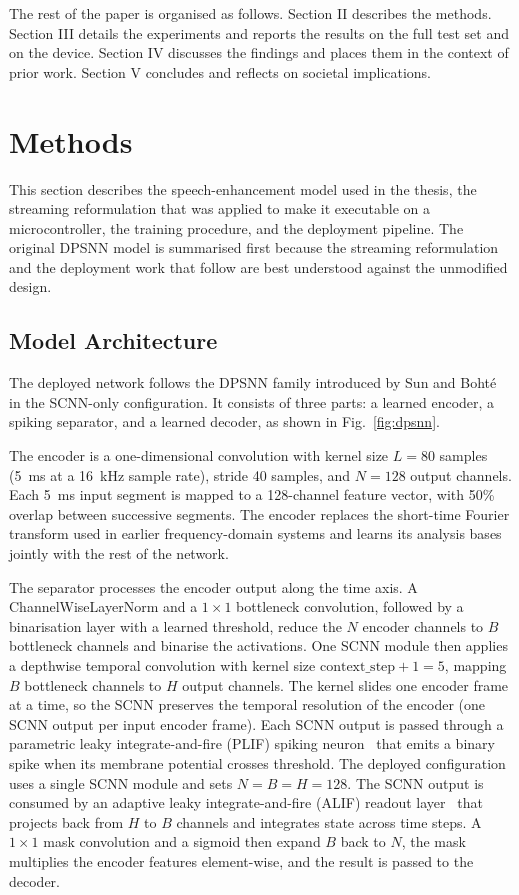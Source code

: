 \documentclass[conference]{IEEEtran}
\begin{document}
The rest of the paper is organised as follows. Section II describes the methods. Section III details the experiments and reports the results on the full test set and on the device. Section IV discusses the findings and places them in the context of prior work. Section V concludes and reflects on societal implications.


\section{Methods}

This section describes the speech-enhancement model used in the thesis, the streaming reformulation that was applied to make it executable on a microcontroller, the training procedure, and the deployment pipeline. The original DPSNN model is summarised first because the streaming reformulation and the deployment work that follow are best understood against the unmodified design.

\subsection{Model Architecture}

The deployed network follows the DPSNN family introduced by Sun and Bohté~\cite{b4} in the SCNN-only configuration. It consists of three parts: a learned encoder, a spiking separator, and a learned decoder, as shown in Fig.~\ref{fig:dpsnn}.

The encoder is a one-dimensional convolution with kernel size $L = 80$ samples (5~ms at a 16~kHz sample rate), stride 40 samples, and $N = 128$ output channels. Each 5~ms input segment is mapped to a 128-channel feature vector, with 50\% overlap between successive segments. The encoder replaces the short-time Fourier transform used in earlier frequency-domain systems and learns its analysis bases jointly with the rest of the network.

The separator processes the encoder output along the time axis. A ChannelWiseLayerNorm and a $1 \times 1$ bottleneck convolution, followed by a binarisation layer with a learned threshold, reduce the $N$ encoder channels to $B$ bottleneck channels and binarise the activations. One SCNN module then applies a depthwise temporal convolution with kernel size $\text{context\_step}+1 = 5$, mapping $B$ bottleneck channels to $H$ output channels. The kernel slides one encoder frame at a time, so the SCNN preserves the temporal resolution of the encoder (one SCNN output per input encoder frame). Each SCNN output is passed through a parametric leaky integrate-and-fire (PLIF) spiking neuron~\cite{plif} that emits a binary spike when its membrane potential crosses threshold. The deployed configuration uses a single SCNN module and sets $N=B=H=128$. The SCNN output is consumed by an adaptive leaky integrate-and-fire (ALIF) readout layer~\cite{alif} that projects back from $H$ to $B$ channels and integrates state across time steps. A $1 \times 1$ mask convolution and a sigmoid then expand $B$ back to $N$, the mask multiplies the encoder features element-wise, and the result is passed to the decoder.
\end{document}
